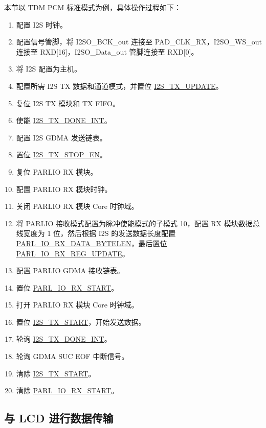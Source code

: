 \documentclass[main\_\_CN.tex]{subfiles}
\begin{document}
本节以 TDM PCM 标准模式为例，具体操作过程如下：

\begin{enumerate}
    \item 配置 I2S 时钟。
    \item 配置信号管脚，将 I2SO\_BCK\_out 连接至 PAD\_CLK\_RX，I2SO\_WS\_out 连接至 RXD[16]，I2SO\_Data\_out 管脚连接至 RXD[0]。
    \item 将 I2S 配置为主机。
    \item 配置所需 I2S TX 数据和通道模式，并置位 \hyperref[fielddesc:I2STXUPDATE]{I2S\_TX\_UPDATE}。
    \item 复位 I2S TX 模块和 TX FIFO。
    \item 使能 \hyperref[int:I2STXDONEINT]{I2S\_TX\_DONE\_INT}。 
    \item 配置 I2S GDMA 发送链表。
    \item 置位 \hyperref[fielddesc:I2STXSTOPEN]{I2S\_TX\_STOP\_EN}。
    \item 复位 PARLIO RX 模块。
    \item 配置 PARLIO RX 模块时钟。
    \item 关闭 PARLIO RX 模块 Core 时钟域。
    \item 将 PARLIO 接收模式配置为脉冲使能模式的子模式 10，配置 RX 模块数据总线宽度为 1 位，然后根据 I2S 的发送数据长度配置 \hyperref[fielddesc:PARLIORXDATABYTELEN]{PARL\_IO\_RX\_DATA\_BYTELEN}，最后置位 \hyperref[fielddesc:PARLIORXREGUPDATE]{PARL\_IO\_RX\_REG\_UPDATE}。
    \item 配置 PARLIO GDMA 接收链表。
    \item 置位 \hyperref[fielddesc:PARLIORXSTART]{PARL\_IO\_RX\_START}。
    \item 打开 PARLIO RX 模块 Core 时钟域。
    \item 置位 \hyperref[fielddesc:I2STXSTART]{I2S\_TX\_START}，开始发送数据。
    \item 轮询 \hyperref[int:I2STXDONEINT]{I2S\_TX\_DONE\_INT}。 
    \item 轮询 GDMA SUC EOF 中断信号。
    \item 清除 \hyperref[fielddesc:I2STXSTART]{I2S\_TX\_START}。
    \item 清除 \hyperref[fielddesc:PARLIORXSTART]{PARL\_IO\_RX\_START}。
\end{enumerate}

\subsection{与 LCD 进行数据传输}\label{parlio-lcd-data-trans}
\end{document}
